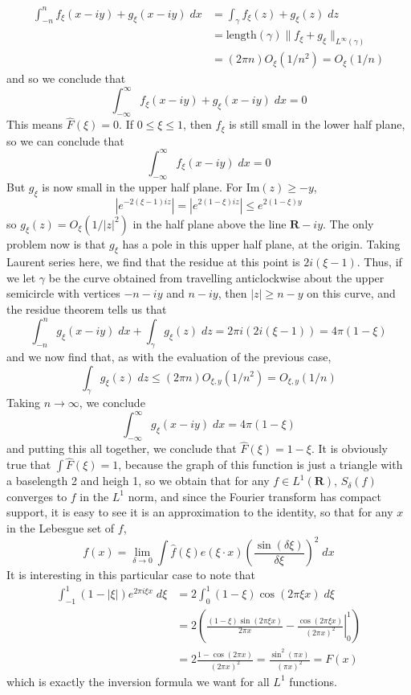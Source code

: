 \begin{example}
	\begin{align*}
		\int_{-n}^n f_\xi(x - iy) + g_\xi(x - iy)\; dx &= \int_\gamma f_\xi(z) + g_\xi(z)\; dz\\
		&= \text{length}(\gamma) \| f_\xi + g_\xi \|_{L^\infty(\gamma)}\\
		&= (2 \pi n) O_\xi(1/n^2) = O_\xi(1/n)
	\end{align*}
	and so we conclude that
	\[ \int_{-\infty}^\infty f_\xi(x - iy) + g_\xi(x - iy)\; dx = 0 \]
	This means $\widehat{F}(\xi) = 0$. If $0 \leq \xi \leq 1$, then $f_\xi$ is still small in the lower half plane, so we can conclude that
	\[ \int_{-\infty}^\infty f_\xi(x - iy)\; dx = 0 \]
	But $g_\xi$ is now small in the upper half plane. For $\text{Im}(z) \geq -y$,
	\[ |e^{-2(\xi - 1)iz}| = |e^{2(1 - \xi)iz}| \leq e^{2(1 - \xi)y} \] 
	so $g_\xi(z) = O_\xi(1/|z|^2)$ in the half plane above the line $\mathbf{R} - iy$. The only problem now is that $g_\xi$ has a pole in this upper half plane, at the origin. Taking Laurent series here, we find that the residue at this point is $2i(\xi - 1)$. Thus, if we let $\gamma$ be the curve obtained from travelling anticlockwise about the upper semicircle with vertices $-n - iy$ and $n - iy$, then $|z| \geq n - y$ on this curve, and the residue theorem tells us that
	\[ \int_{-n}^n g_\xi(x - iy)\; dx + \int_\gamma g_\xi(z)\; dz = 2\pi i (2i(\xi - 1)) = 4 \pi (1 - \xi) \]
	and we now find that, as with the evaluation of the previous case,
	\[ \int_\gamma g_\xi(z)\; dz \leq (2 \pi n) O_{\xi,y}(1/n^2) = O_{\xi,y}(1/n) \]
	Taking $n \to \infty$, we conclude
	\[ \int_{-\infty}^\infty g_\xi(x - iy)\; dx = 4 \pi (1 - \xi) \]
	and putting this all together, we conclude that $\widehat{F}(\xi) = 1 - \xi$. It is obviously true that $\int \widehat{F}(\xi) = 1$, because the graph of this function is just a triangle with a baselength 2 and heigh 1, so we obtain that for any $f \in L^1(\mathbf{R})$, $S_\delta(f)$ converges to $f$ in the $L^1$ norm, and since the Fourier transform has compact support, it is easy to see it is an approximation to the identity, so that for any $x$ in the Lebesgue set of $f$,
	\[ f(x) = \lim_{\delta \to 0} \int \widehat{f}(\xi) e(\xi \cdot x) \left( \frac{\sin(\delta \xi)}{\delta \xi} \right)^2\; dx \]
	It is interesting in this particular case to note that
	\begin{align*}
		\int_{-1}^1 (1 - |\xi|) e^{2 \pi i\xi x}\; d\xi &= 2 \int_0^1 (1 - \xi) \cos(2 \pi \xi x)\; d\xi\\
		&= 2 \left( \left. \frac{(1 - \xi) \sin(2 \pi \xi x)}{2 \pi x} - \frac{\cos(2 \pi \xi x)}{(2 \pi x)^2} \right|_0^1 \right)\\
		&= 2 \frac{1 - \cos(2 \pi x)}{(2 \pi x)^2} = \frac{\sin^2(\pi x)}{(\pi x)^2} = F(x)
	\end{align*}
	which is exactly the inversion formula we want for all $L^1$ functions.
\end{example}

